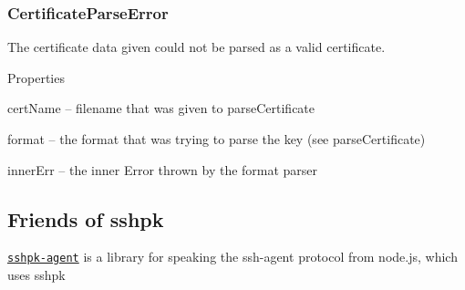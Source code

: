 \subsubsection*{{\ttfamily Certificate\+Parse\+Error}}

The certificate data given could not be parsed as a valid certificate.

Properties


\begin{DoxyItemize}
\item {\ttfamily cert\+Name} -- {\ttfamily filename} that was given to {\ttfamily parse\+Certificate}
\item {\ttfamily format} -- the {\ttfamily format} that was trying to parse the key (see {\ttfamily parse\+Certificate})
\item {\ttfamily inner\+Err} -- the inner Error thrown by the format parser
\end{DoxyItemize}

\subsection*{Friends of sshpk }


\begin{DoxyItemize}
\item \href{https://github.com/arekinath/node-sshpk-agent}{\tt {\ttfamily sshpk-\/agent}} is a library for speaking the {\ttfamily ssh-\/agent} protocol from node.\+js, which uses {\ttfamily sshpk} 
\end{DoxyItemize}